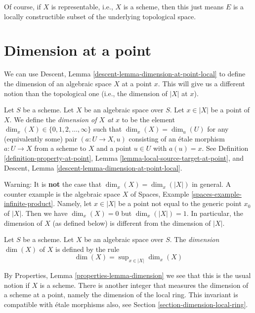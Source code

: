 \noindent
Of course, if $X$ is representable, i.e., $X$ is a scheme,
then this just means $E$ is a locally constructible subset
of the underlying topological space.







\section{Dimension at a point}
\label{section-dimension}

\noindent
We can use
Descent, Lemma \ref{descent-lemma-dimension-at-point-local}
to define the dimension of an algebraic
space $X$ at a point $x$. This will give us a different notion than the
topological one (i.e., the dimension of $|X|$ at $x$).

\begin{definition}
\label{definition-dimension-at-point}
Let $S$ be a scheme.
Let $X$ be an algebraic space over $S$.
Let $x \in |X|$ be a point of $X$.
We define the {\it dimension of $X$ at $x$} to be
the element $\dim_x(X) \in \{0, 1, 2, \ldots, \infty\}$
such that $\dim_x(X) = \dim_u(U)$ for any (equivalently some)
pair $(a : U \to X, u)$ consisting of an \'etale morphism $a : U \to X$
from a scheme to $X$ and a point $u \in U$ with $a(u) = x$.
See
Definition \ref{definition-property-at-point},
Lemma \ref{lemma-local-source-target-at-point}, and
Descent, Lemma \ref{descent-lemma-dimension-at-point-local}.
\end{definition}

\noindent
Warning: It is {\bf not} the case that $\dim_x(X) = \dim_x(|X|)$
in general. A counter example is the algebraic space $X$ of
Spaces, Example \ref{spaces-example-infinite-product}.
Namely, let $x \in |X|$ be a point not equal to the generic point $x_0$
of $|X|$. Then we have $\dim_x(X) = 0$ but $\dim_x(|X|) = 1$.
In particular, the dimension of $X$ (as defined
below) is different from the dimension of $|X|$.

\begin{definition}
\label{definition-dimension}
Let $S$ be a scheme. Let $X$ be an algebraic space over $S$.
The {\it dimension} $\dim(X)$ of $X$ is defined by the rule
$$
\dim(X) = \sup\nolimits_{x \in |X|} \dim_x(X)
$$
\end{definition}

\noindent
By
Properties, Lemma \ref{properties-lemma-dimension}
we see that this is the usual notion if $X$ is a scheme.
There is another integer that measures the dimension of a scheme
at a point, namely the dimension of the local ring. This invariant
is compatible with \'etale morphisms also, see
Section \ref{section-dimension-local-ring}.






